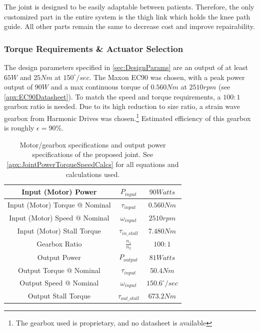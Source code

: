 The joint is designed to be easily adaptable between patients. Therefore, the only customized part in the entire system is the thigh link which holds the knee path guide. All other parts remain the same to decrease cost and improve repairability.

\subsubsection{Torque Requirements \& Actuator Selection}

The design parameters specified in \autoref{sec:DesignParams} are an output of at least \(65 W\) and \(25 Nm\) at \(150^\circ/sec\). The Maxon EC90 was chosen, with a peak power output of \(90W\) and a max continuous torque of \(0.560 Nm\) at \(2510 rpm\) (see \autoref{apx:EC90Datasheet}). To match the speed and torque requirements, a \(100:1\) gearbox ratio is needed. Due to its high reduction to size ratio, a strain wave gearbox from {Harmonic Drives\texttrademark} was chosen.\footnote{The gearbox used is proprietary, and no datasheet is available} Estimated efficiency of this gearbox is roughly \(\epsilon = 90\%\).

\begin{table}
    \centering
    \begin{tabular}{||c|c|c||}
        \hline
        Input (Motor) Power & \(P_{input}\) & \(90 Watts\) \\
        \hline
        Input (Motor) Torque @ Nominal & \(\tau_{input}\) & \(0.560 Nm\) \\
        \hline
        Input (Motor) Speed @ Nominal & \(\omega_{input}\) & \(2510 rpm\) \\
        \hline
        Input (Motor) Stall Torque & \(\tau_{in\_stall}\) & \(7.480 Nm\) \\
        \hline \hline
        Gearbox Ratio & \(\frac{n_1}{n_2}\) & \(100:1\) \\
        \hline \hline
        Output Power & \(P_{output}\) & \(81 Watts\) \\
        \hline
        Output Torque @ Nominal & \(\tau_{input}\) & \(50.4 Nm\) \\
        \hline
        Output Speed @ Nominal & \(\omega_{input}\) & \(150.6^\circ/sec\) \\
        \hline
        Output Stall Torque & \(\tau_{out\_stall}\) & \(673.2 Nm\) \\
        \hline
    \end{tabular}
    \caption{Motor/gearbox specifications and output power specifications of the proposed joint. See \autoref{apx:JointPowerTorqueSpeedCalcs} for all equations and calculations used.}
    \label{table:MotorGearboxSpecs}
\end{table}

